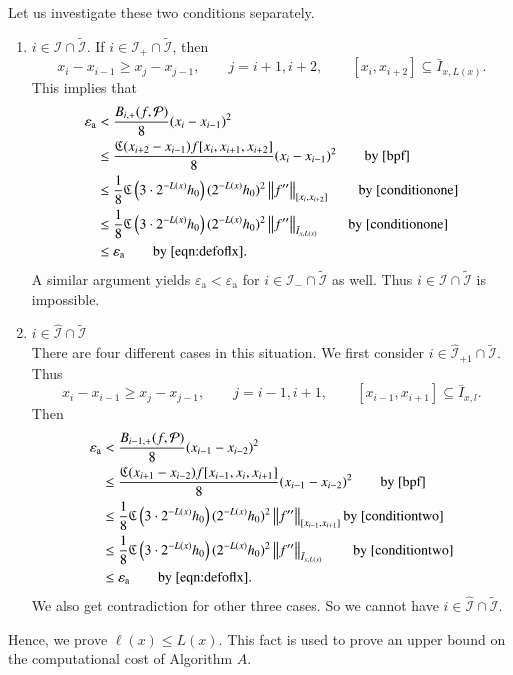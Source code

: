 \documentclass[review]{elsarticle}
\newcommand{\abstol}{\varepsilon_{\textrm{a}}}
\theoremstyle{definition}
\begin{document}
Let us investigate these two conditions separately.
\begin{enumerate}
	\item $i \in \mathcal{I} \cap \widetilde{\mathcal{I}}$.  If $i \in \mathcal{I}_+ \cap \widetilde{\mathcal{I}}$, then
	\begin{equation}
	\label{conditionone} x_{i}-x_{i-1} \ge x_{j}-x_{j-1}, \qquad   j=i+1,i+2, \qquad [x_i,x_{i+2}] \subseteq \bar{I}_{x,L(x)}.
	\end{equation}
	This implies that
	\begin{align*}
	\abstol & <  \frac{B_{i,+}(f,\cp)}{8}(x_i-x_{i-1})^2 \\
	& \le \frac{\fC(x_{i+2}-x_{i-1})f[x_{i},x_{i+1},x_{i+2}]}{8}(x_{i}-x_{i-1})^2 \qquad \text{by}~\eqref{bpf} \\
	&\le  \frac 1 8 \fC\left(3\cdot2^{-L(x)}h_0\right) (2^{-L(x)}h_0)^2\norm[{[x_{i},x_{i+2}]}]{f''} \qquad \text{by}~\eqref{conditionone} \\
	& \le   \frac 1 8 \fC\left(3\cdot2^{-L(x)}h_0\right) (2^{-L(x)}h_0)^2  \norm[\bar{I}_{x,L(x)}]{f''}  \qquad \text{by}~\eqref{conditionone} \\
	& \le    \abstol \qquad \text{by}~\eqref{eqn:defoflx} .
	\end{align*}
	A similar argument yields $\abstol < \abstol$ for $i \in \mathcal{I}_- \cap \widetilde{\mathcal{I}}$ as well.  Thus $i \in \mathcal{I} \cap \widetilde{\mathcal{I}}$ is impossible.
	\item $i \in \widehat{\mathcal{I}}\cap \widetilde{\mathcal{I}}$\\
	There are four different cases in this situation. We first consider $i \in \widehat{\mathcal{I}}_{+1} \cap \widetilde{\mathcal{I}}$.
	Thus
	\begin{equation} \label{conditiontwo}
	x_{i}-x_{i-1} \ge x_{j}-x_{j-1},\qquad j=i-1,i+1, \qquad [x_{i-1},x_{i+1}] \subseteq \bar{I}_{x,l}.
	\end{equation}
	Then
	\begin{align*}
	\abstol & < \frac{B_{i-1,+}(f,\cp)}{8}(x_{i-1}-x_{i-2})^2 \\
	& \le  \frac{\fC(x_{i+1}-x_{i-2})f[x_{i-1},x_{i},x_{i+1}]}{8}(x_{i-1}-x_{i-2})^2 \qquad  \text{by}~\eqref{bpf}   \\
	& \le  \frac 1 8 \fC\left(3\cdot2^{-L(x)}h_0\right) (2^{-L(x)}h_0)^2 \norm[{[x_{i-1},x_{i+1}]}]{f''}  \text{by}~\eqref{conditiontwo}  \\
	& \le   \frac 1 8 \fC\left(3\cdot2^{-L(x)}h_0\right) (2^{-L(x)}h_0)^2 \norm[\bar{I}_{x,L(x)}]{f''} \qquad \text{by}~\eqref{conditiontwo}  \\
	& \le  \abstol \qquad \text{by}~\eqref{eqn:defoflx}.
	\end{align*}
	We also get contradiction for other three cases. So we cannot have $i \in \widehat{\mathcal{I}}\cap \widetilde{\mathcal{I}}$.
\end{enumerate}
Hence, we prove $\ell(x) \le L(x)$. This fact is used to prove an upper bound on the computational cost of Algorithm $A$.
\end{document}
